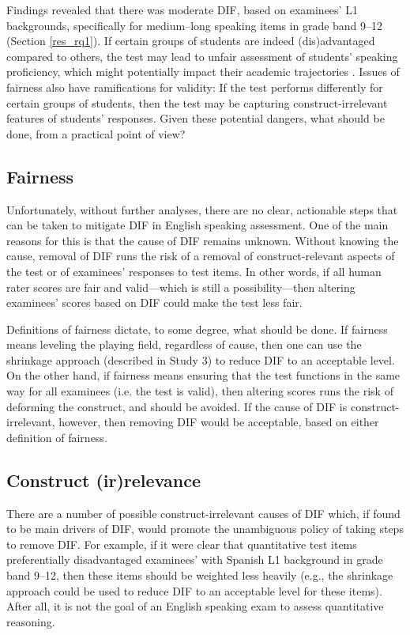 \documentclass [PhD] {uclathes}
\begin{document}
Findings revealed that there was moderate DIF, based on examinees’ L1 backgrounds, specifically for medium–long speaking items in grade band 9–12 (Section \ref{res_rq1}). If certain groups of students are indeed (dis)advantaged compared to others, the test may lead to unfair assessment of students’ speaking proficiency, which might potentially impact their academic trajectories \citep{johnson2019effects}. Issues of fairness also have ramifications for validity: If the test performs differently for certain groups of students, then the test may be capturing construct-irrelevant features of students’ responses. Given these potential dangers, what should be done, from a practical point of view?

\subsection{Fairness}

Unfortunately, without further analyses, there are no clear, actionable steps that can be taken to mitigate DIF in English speaking assessment. One of the main reasons for this is that the cause of DIF remains unknown. Without knowing the cause, removal of DIF runs the risk of a removal of construct-relevant aspects of the test or of examinees’ responses to test items. In other words, if all human rater scores are fair and valid—which is still a possibility—then altering examinees’ scores based on DIF could make the test less fair. 

Definitions of fairness dictate, to some degree, what should be done. If fairness means leveling the playing field, regardless of cause, then one can use the shrinkage approach (described in Study 3) to reduce DIF to an acceptable level. On the other hand, if fairness means ensuring that the test functions in the same way for all examinees (i.e. the test is valid), then altering scores runs the risk of deforming the construct, and should be avoided. If the cause of DIF is construct-irrelevant, however, then removing DIF would be acceptable, based on either definition of fairness.

\subsection{Construct (ir)relevance}

There are a number of possible construct-irrelevant causes of DIF which, if found to be main drivers of DIF, would promote the unambiguous policy of taking steps to remove DIF. For example, if it were clear that quantitative test items preferentially disadvantaged examinees’ with Spanish L1 background in grade band 9–12, then these items should be weighted less heavily (e.g., the shrinkage approach could be used to reduce DIF to an acceptable level for these items). After all, it is not the goal of an English speaking exam to assess quantitative reasoning. 
\end{document}
